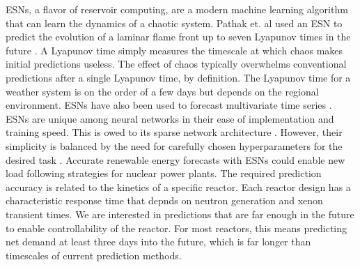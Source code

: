 \glspl{ESN}, a flavor of reservoir computing, are a modern
machine learning algorithm that can learn the dynamics of a chaotic system.
Pathak et. al used an \gls{ESN} to predict the
evolution of a laminar flame front up to seven Lyapunov
times in the future \cite{pathak_model-free_2018, wikner_combining_2020}. A
Lyapunov time simply measures the timescale at which chaos makes initial
predictions useless. The effect of chaos typically overwhelms conventional
predictions after a single Lyapunov time, by definition.
The Lyapunov time for a weather system is on the order of a few days but
depends on the regional environment. \glspl{ESN} have also been used to
forecast multivariate time series \cite{bianchi_reservoir_2020}. \glspl{ESN}
are unique among neural
networks in their ease of implementation and training speed. This is owed to its
sparse network architecture \cite{pathak_model-free_2018,
wikner_combining_2020, vannitsem_predictability_2017}. However,
their simplicity is balanced by the need for carefully chosen hyperparameters
for the desired task \cite{lukosevicius_practical_2012}.
Accurate renewable energy forecasts with \glspl{ESN} could enable new load
following strategies for nuclear power plants. The required prediction accuracy
is related to the kinetics of a specific reactor. Each reactor design has a
characteristic response time that depnds on neutron generation and xenon
transient times. We are interested in predictions that are far enough in the
future to enable controllability of the reactor. For most reactors, this means
predicting net demand at least three days into the future, which is far longer
than timescales of current prediction methods.

